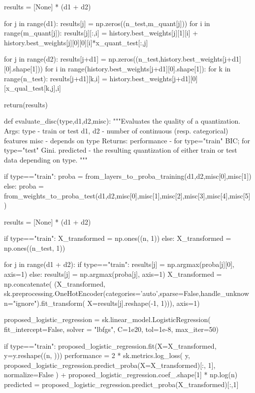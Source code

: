 \begin{pylisting}
        results = [None] * (d1 + d2)    

        for j in range(d1):
            results[j] = np.zeros((n_test,m_quant[j]))
            for i in range(m_quant[j]):
                results[j][:,i] = history.best_weights[j][1][i] + history.best_weights[j][0][0][i]*x_quant_test[:,j]


        for j in range(d2):
            results[j+d1] = np.zeros((n_test,history.best_weights[j+d1][0].shape[1]))
            for i in range(history.best_weights[j+d1][0].shape[1]):
                for k in range(n_test):
                    results[j+d1][k,i] = history.best_weights[j+d1][0][x_qual_test[k,j],i]

        return(results)
    
    
    def evaluate_disc(type,d1,d2,misc):
        """Evaluates the quality of a quantization.
	    Args:
	       type - train or test
	       d1, d2 - number of continuous (resp. categorical) features
	       misc - depends on type
	    Returns:
		  performance - for type="train" BIC; for type="test" Gini.
		  predicted - the resulting quantization of either train or test data depending on type.
	    """

        if type=="train":
            proba = from_layers_to_proba_training(d1,d2,misc[0],misc[1])
        else:
            proba = from_weights_to_proba_test(d1,d2,misc[0],misc[1],misc[2],misc[3],misc[4],misc[5])


        results = [None] * (d1 + d2)

        if type=="train":
            X_transformed = np.ones((n, 1))
        else:
            X_transformed = np.ones((n_test, 1))

        for j in range(d1 + d2):
            if type=="train":
                results[j] = np.argmax(proba[j][0], axis=1)
            else:
                results[j] = np.argmax(proba[j], axis=1)
            X_transformed = np.concatenate(
                (X_transformed, sk.preprocessing.OneHotEncoder(categories='auto',sparse=False,handle_unknown="ignore").fit_transform(
                    X=results[j].reshape(-1, 1))),
                axis=1)

        proposed_logistic_regression = sk.linear_model.LogisticRegression(
            fit_intercept=False, solver = "lbfgs", C=1e20, tol=1e-8, max_iter=50)


        if type=="train":
            proposed_logistic_regression.fit(X=X_transformed, y=y.reshape((n, )))
            performance = 2 * sk.metrics.log_loss(
              y,
              proposed_logistic_regression.predict_proba(X=X_transformed)[:, 1],
              normalize=False
          ) + proposed_logistic_regression.coef_.shape[1] * np.log(n)
            predicted = proposed_logistic_regression.predict_proba(X_transformed)[:,1]


\end{pylisting}
